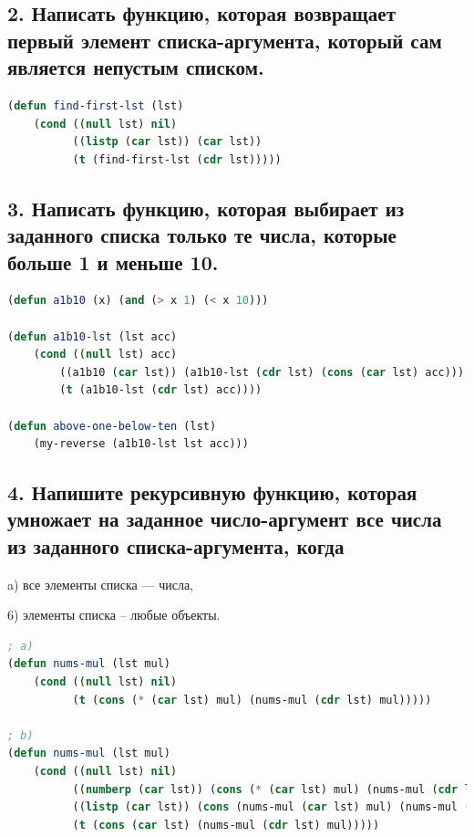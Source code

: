 \documentclass[12pt]{report}
\begin{document}
\subsection*{2. Написать функцию, которая возвращает первый элемент списка-аргумента, который сам
	является непустым списком.}

\begin{lstlisting}[label=6xd, caption=Решение задания №2, language=lisp]
(defun find-first-lst (lst) 
	(cond ((null lst) nil)
		  ((listp (car lst)) (car lst)) 
		  (t (find-first-lst (cdr lst)))))

\end{lstlisting}

\subsection*{3. Написать функцию, которая выбирает из заданного списка только те числа, которые
	больше 1 и меньше 10.}

\begin{lstlisting}[label=6xd, caption=Решение задания №3, language=lisp]
(defun a1b10 (x) (and (> x 1) (< x 10)))

(defun a1b10-lst (lst acc) 
	(cond ((null lst) acc) 
		((a1b10 (car lst)) (a1b10-lst (cdr lst) (cons (car lst) acc))) 
		(t (a1b10-lst (cdr lst) acc))))
		
(defun above-one-below-ten (lst)
	(my-reverse (a1b10-lst lst acc)))

\end{lstlisting}

\subsection*{4. Напишите рекурсивную функцию, которая умножает на заданное число-аргумент все
	числа
	из заданного списка-аргумента, когда}

a) все элементы списка --- числа,

6) элементы списка -- любые объекты.

\begin{lstlisting}[label=6xd, caption=Решение задания №4, language=lisp]
; a)
(defun nums-mul (lst mul) 
	(cond ((null lst) nil)
		  (t (cons (* (car lst) mul) (nums-mul (cdr lst) mul)))))

; b)
(defun nums-mul (lst mul)
	(cond ((null lst) nil)
		  ((numberp (car lst)) (cons (* (car lst) mul) (nums-mul (cdr lst) mul)))
		  ((listp (car lst)) (cons (nums-mul (car lst) mul) (nums-mul (cdr lst) mul)))
		  (t (cons (car lst) (nums-mul (cdr lst) mul)))))

\end{lstlisting}
\end{document}
